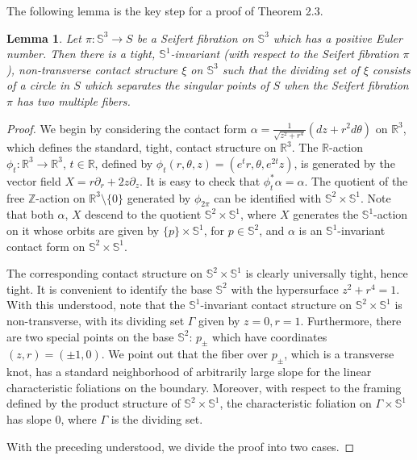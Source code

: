 \documentclass[11pt]{amsart}
\theoremstyle{plain}
\numberwithin{theorem}{section}
\newtheorem{lemma}[theorem]{Lemma}
\theoremstyle{definition}
\newcommand{\R}{{\mathbb R}}
\newcommand{\Z}{{\mathbb Z}}
\newcommand{\s}{{\mathbb S}}
\begin{document}
The following lemma is the key step for a proof of Theorem 2.3.

\begin{lemma}
Let $\pi: \s^3\rightarrow S$ be a Seifert fibration on $\s^3$ which has a positive Euler number. Then
there is a tight, $\s^1$-invariant (with respect to the Seifert fibration $\pi$), non-transverse contact structure $\xi$ on $\s^3$ such that the dividing set of $\xi$ consists of a circle in $S$ which separates the singular points of $S$ when the Seifert fibration $\pi$ has two multiple fibers. 
\end{lemma}

\begin{proof}
We begin by considering the contact form $\alpha=\frac{1}{\sqrt{z^2+r^4}}(dz+r^2 d\theta)$ on $\R^3$, which defines the standard, tight, contact structure on $\R^3$. The $\R$-action $\phi_t: \R^3\rightarrow \R^3$, $t\in\R$, defined by $\phi_t(r,\theta,z)=(e^t r,\theta,e^{2t}z)$, is generated by the vector field
$X=r\partial_r+2z\partial_z$. It is easy to check that $\phi_t^\ast\alpha=\alpha$. The quotient of the free $\Z$-action on $\R^3\setminus\{0\}$ generated by $\phi_{2\pi}$ can be identified with $\s^2\times \s^1$. Note that both $\alpha$, $X$ descend to the quotient $\s^2\times \s^1$, where $X$ generates the $\s^1$-action on it whose orbits are given by $\{p\}\times \s^1$, for $p\in \s^2$, and $\alpha$ is an $\s^1$-invariant contact form on $\s^2\times \s^1$. 

The corresponding contact structure on $\s^2\times \s^1$ is clearly universally tight, hence tight. 
It is convenient to identify the base $\s^2$ with the hypersurface $z^2+r^4=1$. With this understood, 
note that the $\s^1$-invariant contact structure on $\s^2\times \s^1$ is non-transverse, with its dividing set $\Gamma$ given by $z=0, r=1$. Furthermore, there are two special points on the base $\s^2$: 
$p_{\pm}$ which have coordinates $(z,r)=(\pm 1,0)$. We point out that the fiber over $p_{\pm}$,
which is a transverse knot, has a standard neighborhood of arbitrarily large slope for the linear characteristic foliations on the boundary. Moreover, with respect to the framing defined by the product structure of $\s^2\times \s^1$, the characteristic foliation on $\Gamma\times \s^1$ has slope $0$, where $\Gamma$ is the dividing set.

With the preceding understood, we divide the proof into two cases.

\vspace{1.5mm}


\end{proof}
\end{document}
